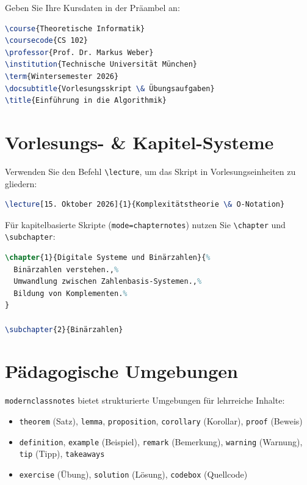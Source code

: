 \documentclass[mode=notes, palette=ocean, lang=german, fontsize=11pt]{modernclassnotes}
\begin{document}
Geben Sie Ihre Kursdaten in der Präambel an:
\begin{codebox}
\begin{lstlisting}[language=TeX]
\course{Theoretische Informatik}
\coursecode{CS 102}
\professor{Prof. Dr. Markus Weber}
\institution{Technische Universität München}
\term{Wintersemester 2026}
\docsubtitle{Vorlesungsskript \& Übungsaufgaben}
\title{Einführung in die Algorithmik}
\end{lstlisting}
\end{codebox}

\section{Vorlesungs- \& Kapitel-Systeme}

Verwenden Sie den Befehl \texttt{\textbackslash lecture}, um das Skript in Vorlesungseinheiten zu gliedern:
\begin{codebox}
\begin{lstlisting}[language=TeX]
\lecture[15. Oktober 2026]{1}{Komplexitätstheorie \& O-Notation}
\end{lstlisting}
\end{codebox}

Für kapitelbasierte Skripte (\texttt{mode=chapternotes}) nutzen Sie \texttt{\textbackslash chapter} und \texttt{\textbackslash subchapter}:
\begin{codebox}
\begin{lstlisting}[language=TeX]
\chapter{1}{Digitale Systeme und Binärzahlen}{%
  Binärzahlen verstehen.,%
  Umwandlung zwischen Zahlenbasis-Systemen.,%
  Bildung von Komplementen.%
}

\subchapter{2}{Binärzahlen}
\end{lstlisting}
\end{codebox}

\section{Pädagogische Umgebungen}

\begin{definition}
\texttt{modernclassnotes} bietet strukturierte Umgebungen für lehrreiche Inhalte:
\begin{itemize}
    \item \texttt{theorem} (Satz), \texttt{lemma}, \texttt{proposition}, \texttt{corollary} (Korollar), \texttt{proof} (Beweis)
    \item \texttt{definition}, \texttt{example} (Beispiel), \texttt{remark} (Bemerkung), \texttt{warning} (Warnung), \texttt{tip} (Tipp), \texttt{takeaways}
    \item \texttt{exercise} (Übung), \texttt{solution} (Lösung), \texttt{codebox} (Quellcode)
\end{itemize}
\end{definition}
\end{document}
